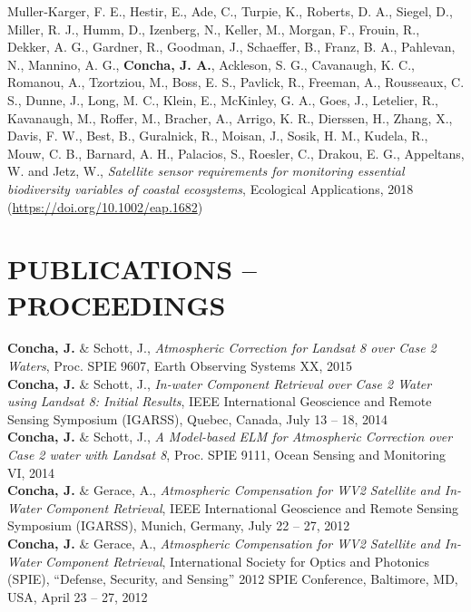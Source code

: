 \documentclass[11pt]{res} %
\begin{document}
\begin{resume}
Muller‐Karger, F. E., Hestir, E., Ade, C., Turpie, K., Roberts, D. A., Siegel, D., Miller, R. J., Humm, D., Izenberg, N., Keller, M., Morgan, F., Frouin, R., Dekker, A. G., Gardner, R., Goodman, J., Schaeffer, B., Franz, B. A., Pahlevan, N., Mannino, A. G., {\bf Concha, J. A.}, Ackleson, S. G., Cavanaugh, K. C., Romanou, A., Tzortziou, M., Boss, E. S., Pavlick, R., Freeman, A., Rousseaux, C. S., Dunne, J., Long, M. C., Klein, E., McKinley, G. A., Goes, J., Letelier, R., Kavanaugh, M., Roffer, M., Bracher, A., Arrigo, K. R., Dierssen, H., Zhang, X., Davis, F. W., Best, B., Guralnick, R., Moisan, J., Sosik, H. M., Kudela, R., Mouw, C. B., Barnard, A. H., Palacios, S., Roesler, C., Drakou, E. G., Appeltans, W. and Jetz, W., {\it Satellite sensor requirements for monitoring essential biodiversity variables of coastal ecosystems}, Ecological Applications, 2018 (\url{https://doi.org/10.1002/eap.1682})\\

\vspace{-0.2in}
\section{PUBLICATIONS -- PROCEEDINGS}
\vspace{0.1in}
{\bf Concha, J.} $\&$ Schott, J., {\it Atmospheric Correction for Landsat 8 over Case 2 Waters}, Proc. SPIE 9607, Earth Observing Systems XX, 2015
\vspace{0.1in}\\
{\bf Concha, J.} $\&$ Schott, J., {\it In-water Component Retrieval over Case 2 Water using Landsat 8: Initial Results}, IEEE International Geoscience and Remote Sensing Symposium (IGARSS), Quebec, Canada, July 13 -- 18, 2014
\vspace{0.1in}\\
{\bf Concha, J.} $\&$ Schott, J., {\it A Model-based ELM for Atmospheric Correction over Case 2 water with Landsat 8}, Proc. SPIE 9111, Ocean Sensing and Monitoring VI, 2014
\vspace{0.1in}\\
{\bf Concha, J.} $\&$ Gerace, A., {\it Atmospheric Compensation for WV2 Satellite and In-Water Component Retrieval}, IEEE International Geoscience and Remote Sensing Symposium (IGARSS), Munich, Germany, July 22 -- 27, 2012
\vspace{0.1in}\\
{\bf Concha, J.} $\&$ Gerace, A., {\it Atmospheric Compensation for WV2 Satellite and In-Water Component Retrieval}, International Society for Optics and Photonics (SPIE), ``Defense, Security, and Sensing'' 2012 SPIE Conference, Baltimore, MD, USA, April 23 -- 27, 2012\\
\vspace{-0.1in}

\end{resume}
\end{document}
